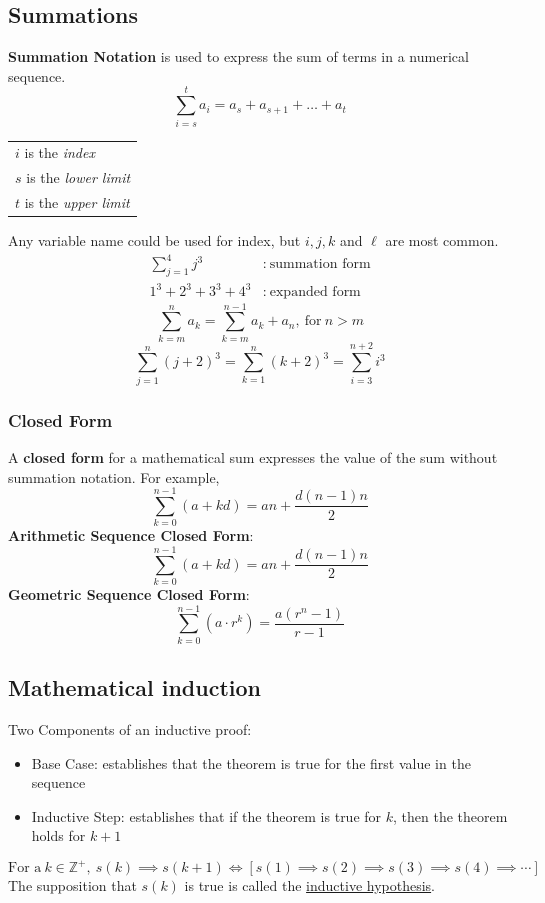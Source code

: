 \subsection{Summations}
\textbf{Summation Notation} is used to express the sum of terms in a numerical sequence.
\[
  \sum_{i=s}^{t} a_i = a_{s} + a_{s+1} + \ldots + a_t
\]
\begin{center}
  \begin{tabular}{l}
    $i$ is the \textit{index}       \\
    $s$ is the \textit{lower limit} \\
    $t$ is the \textit{upper limit}
  \end{tabular}
\end{center}
Any variable name could be used for index, but $i,j,k$ and $\ell$
are most common.
\begin{align*}
  \sum_{j=1}^{4} j^3    & :~\text{summation form} \\
  1^3 + 2^3 + 3^3 + 4^3 & :~\text{expanded form}
\end{align*}
\[
  \sum_{k=m}^{n} a_k = \sum_{k=m}^{n-1} a_k + a_n,~\text{for}~n>m
\]
\[
  \sum_{j=1}^{n} (j+2)^3 = \sum_{k=1}^{n} (k+2)^3 = \sum_{i=3}^{n+2} i^3
\]
\subsubsection*{Closed Form}
A \textbf{closed form} for a mathematical sum expresses the value of the sum without
summation notation. For example,
\[
  \sum_{k=0}^{n-1} (a+kd) = an + \frac{d(n-1)n}{2}
\]
\textbf{Arithmetic Sequence Closed Form}:
\[
  \sum_{k=0}^{n-1} (a+kd) = an + \frac{d(n-1)n}{2}
\]
\textbf{Geometric Sequence Closed Form}:
\[
  \sum_{k=0}^{n-1} (a \cdot r^k) = \frac{a(r^n-1)}{r-1}
\]

\subsection{Mathematical induction}
Two Components of an inductive proof:
\begin{itemize}
  \item Base Case:
        \subitem establishes that the theorem is true for the first value in the sequence
  \item Inductive Step:
        \subitem establishes that if the theorem is true for $k$, then the theorem holds for $k+1$
\end{itemize}
\[
  \text{For a}~k \in \mathbb{Z}^+,~s(k) \implies s(k+1)
  \iff [s(1) \implies s(2) \implies s(3) \implies s(4) \implies \cdots]
\]
The supposition that $s(k)$ is true is called the \underline{inductive hypothesis}.

